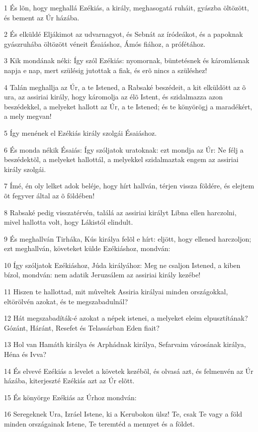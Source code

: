 \par 1 És lõn, hogy meghallá Ezékiás, a király, meghasogatá ruháit, gyászba öltözött, és bement az Úr házába.
\par 2 És elküldé Eljákimot az udvarnagyot, és Sebnát az íródeákot, és a papoknak gyászruhába öltözött véneit Ésaiáshoz, Ámós fiához, a prófétához.
\par 3 Kik mondának néki: Így szól Ezékiás: nyomornak, büntetésnek és káromlásnak napja e nap, mert szülésig jutottak a fiak, és erõ nincs a szüléshez!
\par 4 Talán meghallja az Úr, a te Istened, a Rabsaké beszédeit, a kit elküldött az õ ura, az assiriai király, hogy káromolja az élõ Istent, és szidalmazza azon beszédekkel, a melyeket hallott az Úr, a te Istened; és te könyörögj a maradékért, a mely megvan!
\par 5 Így menének el Ezékiás király szolgái Ésaiáshoz.
\par 6 És monda nékik Ésaiás: Így szóljatok uratoknak: ezt mondja az Úr: Ne félj a beszédektõl, a melyeket hallottál, a melyekkel szidalmaztak engem az assiriai király szolgái.
\par 7 Ímé, én oly lelket adok beléje, hogy hírt hallván, térjen vissza földére, és elejtem õt fegyver által az õ földében!
\par 8 Rabsaké pedig visszatérvén, találá az assiriai királyt Libna ellen harczolni, mivel hallotta volt, hogy Lákistól elindult.
\par 9 És meghallván Tirháka, Kús királya felõl e hírt: eljött, hogy ellened harczoljon; ezt meghallván, követeket külde Ezékiáshoz, mondván:
\par 10 Így szóljatok Ezékiáshoz, Júda királyához: Meg ne csaljon Istened, a kiben bízol, mondván: nem adatik Jeruzsálem az assiriai király kezébe!
\par 11 Hiszen te hallottad, mit mûveltek Assiria királyai minden országokkal, eltörölvén azokat, és te megszabadulnál?
\par 12 Hát megszabadíták-é azokat a népek istenei, a melyeket eleim elpusztítának? Gózánt, Háránt, Resefet és Telassárban Eden fiait?
\par 13 Hol van Hamáth királya és Arphádnak királya, Sefarvaim városának királya, Héna és Ivva?
\par 14 És elvevé Ezékiás a levelet a követek kezébõl, és olvasá azt, és felmenvén az Úr házába, kiterjeszté Ezékiás azt az Úr elõtt.
\par 15 És könyörge Ezékiás az Úrhoz mondván:
\par 16 Seregeknek Ura, Izráel Istene, ki a Kerubokon ülsz! Te, csak Te vagy a föld minden országainak Istene, Te teremtéd a mennyet és a földet.
